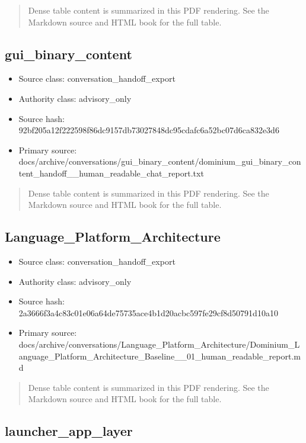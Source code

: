 \documentclass[11pt,a4paper]{report}
\begin{document}
\begin{quote}\small Dense table content is summarized in this PDF rendering. See the Markdown source and HTML book for the full table.\end{quote}

\subsection{gui\_binary\_content}

\begin{itemize}
\item Source class: conversation\_handoff\_export
\item Authority class: advisory\_only
\item Source hash: 92bf205a12f222598f86dc9157db73027848dc95cdafc6a52bc07d6ca832e3d6
\item Primary source: docs/archive/conversations/gui\_binary\_content/dominium\_gui\_binary\_content\_handoff\_\_human\_readable\_chat\_report.txt
\end{itemize}

\begin{quote}\small Dense table content is summarized in this PDF rendering. See the Markdown source and HTML book for the full table.\end{quote}

\subsection{Language\_Platform\_Architecture}

\begin{itemize}
\item Source class: conversation\_handoff\_export
\item Authority class: advisory\_only
\item Source hash: 2a3666f3a4c83c01e06a64de75735ace4b1d20acbc597fe29cf8d50791d10a10
\item Primary source: docs/archive/conversations/Language\_Platform\_Architecture/Dominium\_Language\_Platform\_Architecture\_Baseline\_\_01\_human\_readable\_report.md
\end{itemize}

\begin{quote}\small Dense table content is summarized in this PDF rendering. See the Markdown source and HTML book for the full table.\end{quote}

\subsection{launcher\_app\_layer}
\end{document}
